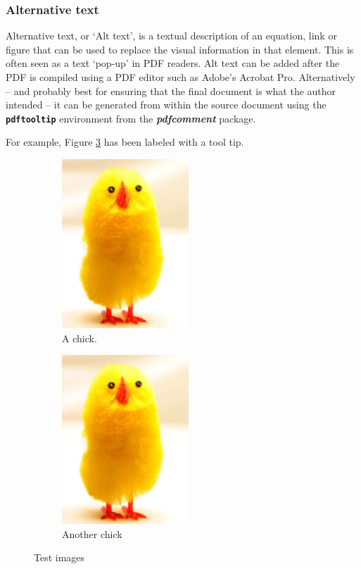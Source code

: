 \documentclass[10pt,twocolumn]{article}
\newcommand{\packagename}[1]{\textbf{\emph{#1}}}
\newcommand{\envname}[1]{\textbf{\texttt{#1}}}
\begin{document}
\subsubsection{Alternative text}\label{sec:Alttext}
Alternative text, or `Alt text', is a textual description of an equation, link or figure that can be used to replace the visual information in that element. This is often seen as a text `pop-up' in PDF readers. Alt text can be added after the PDF is compiled using a PDF editor such as Adobe's Acrobat Pro. Alternatively -- and probably best for ensuring that the final document is what the author intended -- it can be generated from within the source document using the \envname{pdftooltip} environment from the \packagename{pdfcomment} package. 

For example, Figure \ref{fig:AltTextImages} has been labeled with a tool tip.

\begin{figure}
          \begin{subfigure}[b]{.55\linewidth}
            \centering
		\includegraphics[height=2.5in]{Chick1}
            \caption{A chick.}\label{fig:ChickWithAltText}
          \end{subfigure}%
          \begin{subfigure}[b]{.55\linewidth}
            \centering
		\includegraphics[height=2.5in]{Chick1}
            \caption{Another chick}\label{fig:ChickWithAltText2}
          \end{subfigure}
          \caption{Test images}
          \label{fig:AltTextImages}
\end{figure}
\end{document}
